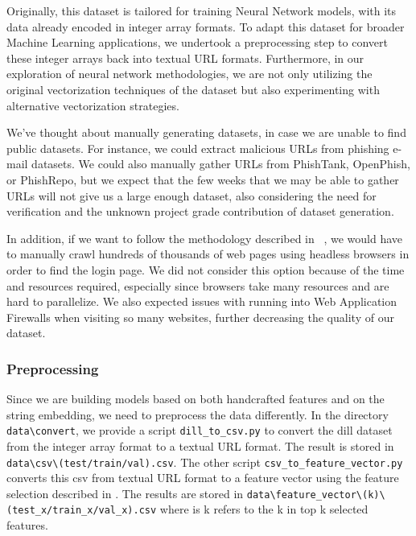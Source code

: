 \documentclass{article}
\begin{document}
    Originally, this dataset is tailored for training Neural Network models, with its data already encoded in integer array formats.
    To adapt this dataset for broader Machine Learning applications, we undertook a preprocessing step to convert these integer arrays back into textual URL formats.
    Furthermore, in our exploration of neural network methodologies, we are not only utilizing the original vectorization techniques of the dataset but also experimenting with alternative vectorization strategies.

    We've thought about manually generating datasets, in case we are unable to find public datasets.
    For instance, we could extract malicious URLs from phishing e-mail datasets.
    We could also manually gather URLs from PhishTank, OpenPhish, or PhishRepo, but we expect that the few weeks that we may be able to gather URLs will not give us a large enough dataset, also considering the need for verification and the unknown project grade contribution of dataset generation.

    In addition, if we want to follow the methodology described in ~\cite{PhishingLoginURLDetection}, we would have to manually crawl hundreds of thousands of web pages using headless browsers in order to find the login page.
    We did not consider this option because of the time and resources required, especially since browsers take many resources and are hard to parallelize.
    We also expected issues with running into Web Application Firewalls when visiting so many websites, further decreasing the quality of our dataset.

    \subsubsection{Preprocessing}\label{subsubsec:preprocessing}
    Since we are building models based on both handcrafted features and on the string embedding, we need to preprocess the data differently.
    In the directory \texttt{data\textbackslash convert}, we provide a script \texttt{dill\_to\_csv.py} to convert the dill dataset from the integer array format to a textual URL format.
    The result is stored in \texttt{data\textbackslash csv\textbackslash (test/train/val).csv}.
    The other script \texttt{csv\_to\_feature\_vector.py} converts this csv from textual URL format to a feature vector using the feature selection described in .
    The results are stored in \texttt{data\textbackslash feature\_vector\textbackslash (k)\textbackslash (test\_x/train\_x/val\_x).csv} where is k refers to the k in top k selected features.
\end{document}
